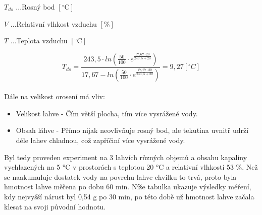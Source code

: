 \(T_{ds}\) ...Rosný bod \([\mathrm{^\circ C}]\)

\(V\) ...Relativní vlhkost vzduchu \([\mathrm{\%}]\)

\(T\) ...Teplota vzduchu \([\mathrm{^\circ C}]\)

\begin{equation}
T_{ds} = \frac{243,5 \cdot ln(\frac{50}{100} \cdot e^{\frac{17,67 \cdot 20}{243,5 + 20}})}{17,67 - ln(\frac{50}{100} \cdot e^{\frac{17,67 \cdot 20}{243,5 + 20}})} = 9,27 [^\circ C]
\label{rosný bod}
\end{equation}
\\
Dále na velikost orosení má vliv:
\begin{itemize}
    \item Velikost lahve - Čím větší plocha, tím více vysrážené vody.
    \item Obsah láhve - Přímo nijak neovlivňuje rosný bod, ale tekutina uvnitř udrží déle lahev chladnou, což zapříčiní více vysrážené vody.
\end{itemize}
\smallskip
Byl tedy proveden experiment na 3 lahvích různých objemů a obsahu kapaliny vychlazených na 5 °C v prostorách s teplotou 20 °C a relativní vlhkostí 53 \%. Než se naakumuluje dostatek vody na povrchu lahve chvilku to trvá, proto byla hmotnost lahve měřena po dobu 60 min. Níže tabulka ukazuje výsledky měření, kdy nejvyšší nárust byl 0,54 g po 30 min, po této době už hmotnost lahve začala klesat na svoji původní hodnotu.


